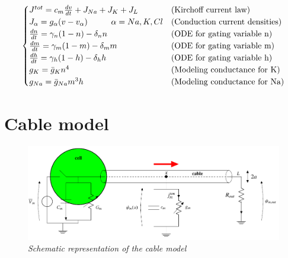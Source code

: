 \documentclass[12pt, a4paper]{report}
\begin{document}
\begin{equation}
\begin{cases}
J^{tot} = c_m \frac{d v}{d t} + J_{Na} + J_K +J_L  & \text{(Kirchoff current law)}\\
J_\alpha = g_\alpha (v-v_\alpha) \hspace{1 cm}  \alpha = Na,K,Cl & \text{(Conduction current densities)}\\
\frac{dn}{dt} = \gamma_n(1-n) - \delta_n n & \text{(ODE for gating variable n)} \\
\frac{dm}{dt} = \gamma_m(1-m) - \delta_m m & \text{(ODE for gating variable m)}\\
\frac{dh}{dt} = \gamma_h(1-h) - \delta_h h & \text{(ODE for gating variable h)}\\
g_K = \bar{g}_K n^4 & \text{(Modeling conductance for K)}\\
g_{Na} = \bar{g}_{Na} m^3h  & \text{(Modeling conductance for Na)}

\end{cases}
\end{equation}

	


\section{Cable model}

\begin{figure}[H]
	\begin{center}
		\hspace*{-0.7cm}
		\includegraphics[scale=0.65]{cable.png} 
	\end{center} 
	\caption{\textit{Schematic representation of the cable model}}
	\label{cable}
\end{figure}
\end{document}
